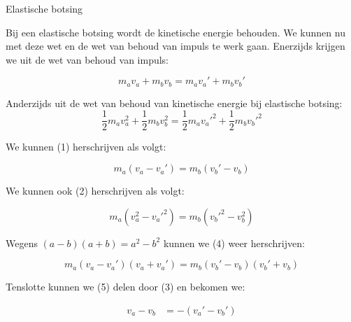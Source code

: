 \begin{app}{Elastische botsing}

    Bij een elastische botsing wordt de kinetische energie behouden. We kunnen nu met deze wet en de wet van behoud van impuls te werk gaan. Enerzijds krijgen we uit de wet van behoud van impuls: 
    
    \begin{equation}
        m_av_a + m_bv_b = m_av_a' + m_bv_b'
    \end{equation}
    
    \noindent Anderzijds uit de wet van behoud van kinetische energie bij elastische botsing:
    \begin{equation}
        \dfrac{1}{2}m_av_a^2 + \dfrac{1}{2}m_bv_b^2 = \dfrac{1}{2}m_a{v_a'}^{2} + \dfrac{1}{2}m_b{v_b'}^{2}
    \end{equation}
    
    \noindent We kunnen (1) herschrijven als volgt:
    
    \begin{equation}
        m_a(v_a - v_a') = m_b(v_b' - v_b)
    \end{equation}
    
    \noindent We kunnen ook (2) herschrijven als volgt:
    
    \begin{equation}
        m_a(v_a^2 - {v_a'}^{2}) = m_b({v_b'}^{2} - v_b^2)
    \end{equation}
    
    \noindent Wegens $ (a-b)(a+b) = a^2-b^2 $ kunnen we (4) weer herschrijven:
    
    \begin{equation}
        m_a(v_a - v_a')(v_a + v_a') = m_b(v_b' - v_b)(v_b' + v_b)
    \end{equation}

    
    \noindent Tenslotte kunnen we (5) delen door (3) en bekomen we:

    \vspace{-0.3cm}
    
    \begin{align*}
        v_a - v_b  &= -(v_a' - v_b') 
    \end{align*}
    

    \vspace{-0.3cm}

\end{app}
    
